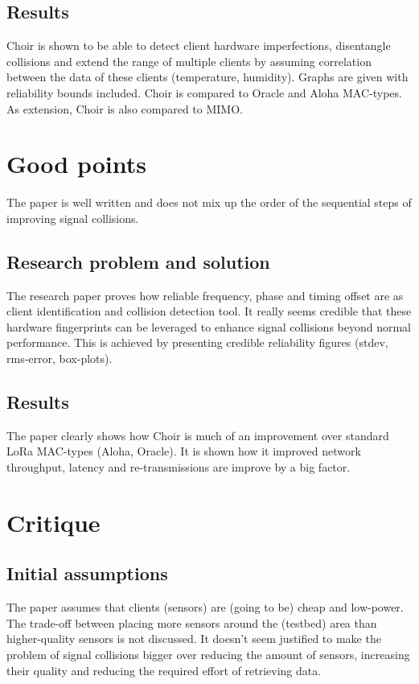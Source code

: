 \documentclass[a4paper,journal]{IEEEtran_custom}
\begin{document}
\subsection{Results}
Choir is shown to be able to detect client hardware imperfections, disentangle collisions and extend the range of multiple clients by assuming correlation between the data of these clients (temperature, humidity). Graphs are given with reliability bounds included. Choir is compared to Oracle and Aloha MAC-types. As extension, Choir is also compared to MIMO.

\section{Good points}
The paper is well written and does not mix up the order of the sequential steps of improving signal collisions.

\subsection{Research problem and solution}
The research paper proves how reliable frequency, phase and timing offset are as client identification and collision detection tool. It really seems credible that these hardware fingerprints can be leveraged to enhance signal collisions beyond normal performance. This is achieved by presenting credible reliability figures (stdev, rms-error, box-plots).

\subsection{Results}
The paper clearly shows how Choir is much of an improvement over standard LoRa MAC-types (Aloha, Oracle). It is shown how it improved network throughput, latency and re-transmissions are improve by a big factor.

\section{Critique}
\subsection{Initial assumptions}
The paper assumes that clients (sensors) are (going to be) cheap and low-power. The trade-off between placing more sensors around the (testbed) area than higher-quality sensors is not discussed. It doesn't seem justified to make the problem of signal collisions bigger over reducing the amount of sensors, increasing their quality and reducing the required effort of retrieving data. \\
\end{document}
